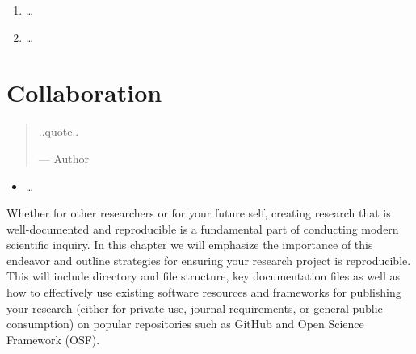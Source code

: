 \documentclass[
  letterpaper,
]{latex/krantz}
\providecommand{\tightlist}{%
  \setlength{\itemsep}{0pt}\setlength{\parskip}{0pt}}\usepackage{longtable,booktabs,array}
\begin{document}
\begin{tcolorbox}[enhanced jigsaw, colframe=quarto-callout-note-color-frame, titlerule=0mm, coltitle=black, colback=white, opacitybacktitle=0.6, colbacktitle=quarto-callout-note-color!10!white, left=2mm, arc=.35mm, leftrule=.75mm, rightrule=.15mm, bottomtitle=1mm, toptitle=1mm, breakable, bottomrule=.15mm, title=\textcolor{quarto-callout-note-color}{\faInfo}\hspace{0.5em}{Technical exercises}, toprule=.15mm, opacityback=0]

\begin{enumerate}
\def\labelenumi{\arabic{enumi}.}
\tightlist
\item
  \ldots{}
\item
  \ldots{}
\end{enumerate}

\end{tcolorbox}

\hypertarget{sec-collaboration}{%
\chapter{Collaboration}\label{sec-collaboration}}

\begin{quote}
..quote..

--- Author
\end{quote}

\begin{tcolorbox}[enhanced jigsaw, colframe=quarto-callout-note-color-frame, titlerule=0mm, coltitle=black, colback=white, opacitybacktitle=0.6, colbacktitle=quarto-callout-note-color!10!white, left=2mm, arc=.35mm, leftrule=.75mm, rightrule=.15mm, bottomtitle=1mm, toptitle=1mm, breakable, bottomrule=.15mm, title=\textcolor{quarto-callout-note-color}{\faInfo}\hspace{0.5em}{Keys}, toprule=.15mm, opacityback=0]

\begin{itemize}
\tightlist
\item
  \ldots{}
\end{itemize}

\end{tcolorbox}

Whether for other researchers or for your future self, creating research
that is well-documented and reproducible is a fundamental part of
conducting modern scientific inquiry. In this chapter we will emphasize
the importance of this endeavor and outline strategies for ensuring your
research project is reproducible. This will include directory and file
structure, key documentation files as well as how to effectively use
existing software resources and frameworks for publishing your research
(either for private use, journal requirements, or general public
consumption) on popular repositories such as GitHub and Open Science
Framework (OSF).
\end{document}
